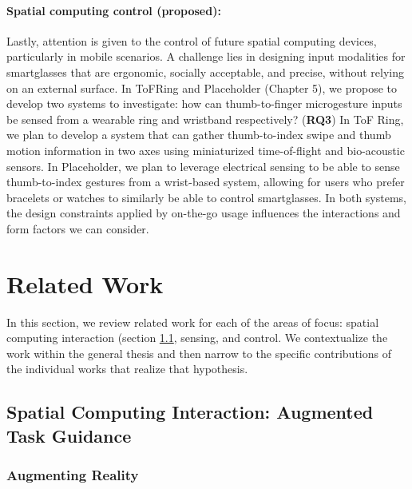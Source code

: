 \documentclass [11pt, proquest] {uwthesis}[2020/02/24]
\begin{document}
\subsubsection{Spatial computing control (proposed):} Lastly, attention is given to the control of future spatial computing devices, particularly in mobile scenarios. A challenge lies in designing input modalities for smartglasses that are ergonomic, socially acceptable, and precise, without relying on an external surface. In ToFRing and Placeholder (Chapter 5), we propose to develop two systems to investigate: how can thumb-to-finger microgesture inputs be sensed from a wearable ring and wristband respectively? (\textbf{RQ3}) In ToF Ring, we plan to develop a system that can gather thumb-to-index swipe and thumb motion information in two axes using miniaturized time-of-flight and bio-acoustic sensors. In Placeholder, we plan to leverage electrical sensing to be able to sense thumb-to-index gestures from a wrist-based system, allowing for users who prefer bracelets or watches to similarly be able to control smartglasses. In both systems, the design constraints applied by on-the-go usage influences the interactions and form factors we can consider.

 
\chapter{Related Work}
\label{sec:related}

In this section, we review related work for each of the areas of focus: spatial computing interaction (section \ref{sec: Spatial Computing Interaction: Augmented Task Guidance}, sensing, and control. We contextualize the work within the general thesis and then narrow to the specific contributions of the individual works that realize that hypothesis.

\section{Spatial Computing Interaction: Augmented Task Guidance}
\label{sec: Spatial Computing Interaction: Augmented Task Guidance}

\subsection{Augmenting Reality}
\label{subsec: Augmented Reality}
\end{document}
